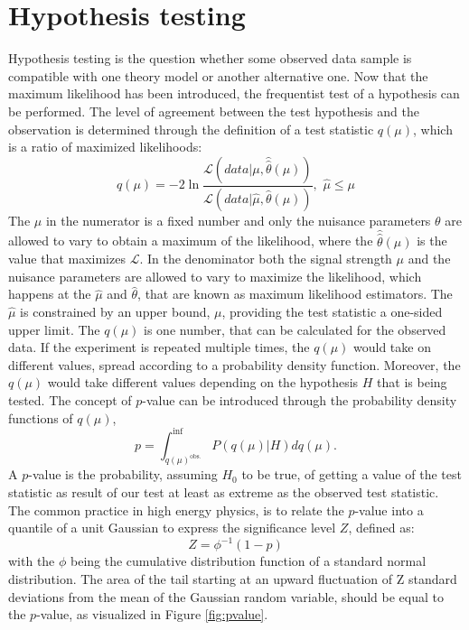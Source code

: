 \section{Hypothesis testing}
\noindent
\justify
Hypothesis testing is the question whether some observed data sample is compatible with one theory model or another alternative one.
Now that the maximum likelihood has been introduced, the frequentist test of a hypothesis can be performed. 
The level of agreement between the test hypothesis and the observation is determined through the definition of a test statistic $q(\mu)$, which is a ratio of maximized likelihoods:
\begin{equation}
q(\mu)=-2\ln\frac{\mathcal{L}(data|\mu, \hat{\hat{\theta}}(\mu))}{\mathcal{L}(data|\hat{\mu}, \hat{\theta}(\mu))},\, \, \hat{\mu}\leq\mu
\end{equation}
The $\mu$ in the numerator is a fixed number and only the nuisance parameters $\theta$ are allowed to vary to obtain a maximum of the likelihood, where the $\hat{\hat{\theta}}(\mu)$ is the value that maximizes $\mathcal{L}$.
In the denominator both the signal strength $\mu$ and the nuisance parameters are allowed to vary to maximize the likelihood, which happens at the $\hat{\mu}$ and $\hat{\theta}$, that are known as maximum likelihood estimators.
The $\hat{\mu}$ is constrained by an upper bound, $\mu$, providing the test statistic a one-sided upper limit. 
The $q(\mu)$ is one number, that can be calculated for the observed data. 
If the experiment is repeated multiple times, the $q(\mu)$ would take on different values, spread according to a probability density function.    
Moreover, the $q(\mu)$ would take different values depending on the hypothesis $H$ that is being tested. 
The concept of $p$-value can be introduced through the probability density functions of $q(\mu)$, 
\begin{equation}
p=\int_{q(\mu)^{\mathrm{obs.}}}^{\inf}P(q(\mu)|H)dq(\mu).
\end{equation} 
A $p$-value is the probability, assuming $H_{0}$ to be true, of getting a value of the test statistic as result of our test at least as extreme as the observed test statistic.
The common practice in high energy physics, is to relate the $p$-value into a quantile of a unit Gaussian to express the significance level $Z$, defined as:
\begin{equation}
Z=\phi^{-1}(1-p)
\end{equation}
with the $\phi$ being the cumulative distribution function of a standard normal distribution. 
The area of the tail starting at an upward fluctuation of Z standard deviations from the mean of the Gaussian random variable, should be equal to the $p$-value, as visualized in Figure \ref{fig:pvalue}.

